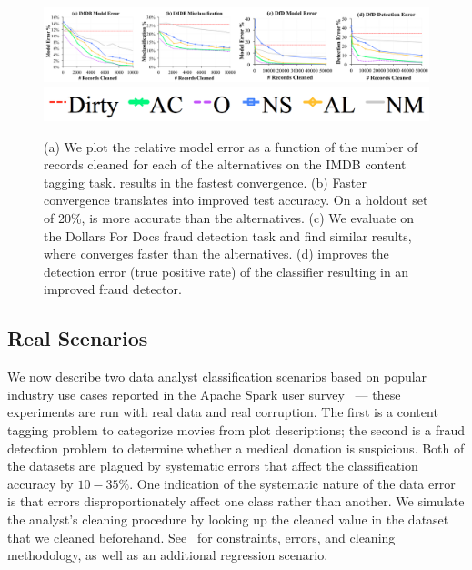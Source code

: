 \begin{figure}[t]
\centering
 \includegraphics[width=\textwidth]{exp/real-experiments-full.png}
 \includegraphics[width=0.6\columnwidth]{exp/legend-real.png}\vspace{-1em}
 \caption{(a) We plot the relative model error as a function of the number of records cleaned for each of the alternatives on the IMDB content tagging task. \sys results in the fastest convergence. (b) Faster convergence translates into improved test accuracy. On a holdout set of 20\%, \sys is more accurate than the alternatives. (c) We evaluate \sys on the Dollars For Docs fraud detection task and find similar results, where \sys converges faster than the alternatives. (d) \sys improves the detection error (true positive rate) of the classifier resulting in an improved fraud detector. \label{real}}\vspace{-1.5em}
\end{figure}

\subsection{Real Scenarios}\label{real-errors}
We now describe two data analyst classification scenarios based on popular industry use cases reported in the Apache Spark user survey~\cite{sparksurvey} --- these experiments are run with real data and real corruption.
The first is a content tagging problem to categorize movies from plot descriptions; 
the second is a fraud detection problem to  determine whether a medical donation is suspicious.
Both of the datasets are plagued by systematic errors that affect the classification accuracy by $10-35\%$.
One indication of the systematic nature of the data error is that errors disproportionately affect one class rather than another.
We simulate the analyst's cleaning procedure by looking up the cleaned value in the dataset that we cleaned beforehand.
See~\cite{activecleanarxiv} for constraints, errors, and cleaning methodology, as well as an additional regression scenario.


